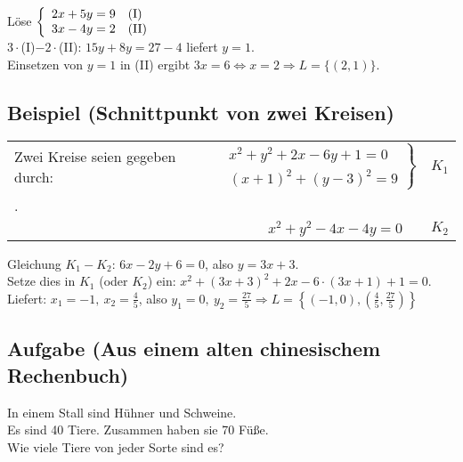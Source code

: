 	Löse  $\left\{  \begin{array}{ll}
                  			2x+5y=9 & \textnormal{(I)}\\
                  			3x-4y=2 & \textnormal{(II)}
                			\end{array}
                \right.$\\
                
    $3\cdot$(I)$-2\cdot$(II):  $15y+8y=27-4$ liefert $y=1$.\\
    Einsetzen von $y=1$ in (II) ergibt $3x=6 \Leftrightarrow x=2 \Rightarrow L=\{(2,1)\}$.
    
    
\subsection[Schnittpunkt von zwei Kreisen]{Beispiel (Schnittpunkt von zwei Kreisen)}
	
	
	\begin{tabular}{@{}lrl}
	
	Zwei Kreise seien gegeben durch: 	& $\left.  \begin{array}{l}
                  								 		x^2+y^2+2x-6y+1=0 \\
                  										(x+1)^2+(y-3)^2=9
                									\end{array}
             						 	  \right\}$ & $K_1$\\.

										&&\\
										&  $x^2+y^2-4x-4y=0 \quad$ &$K_2$
 
	\end{tabular}	\newline
	
	Gleichung $K_1 - K_2$:  $6x-2y+6=0$, also $y=3x+3$.\\
	Setze dies in $K_1$ (oder $K_2$) ein: $x^2+(3x+3)^2+2x-6\cdot (3x+1)+1=0$.\\
	Liefert: $x_1=-1,\ x_2=\frac{4}{5}$, also $y_1=0,\ y_2=\frac{27}{5} \Rightarrow
	L=\left\{(-1,0), \left(\frac{4}{5},\frac{27}{5} \right) \right\}$


\subsection[Aufgabe]{Aufgabe (Aus einem alten chinesischem Rechenbuch)}

	In einem Stall sind Hühner und Schweine.\\
	 Es sind 40 Tiere. Zusammen haben sie 70 Füße.\\ \newline 
	Wie viele Tiere von jeder Sorte sind es?
	
